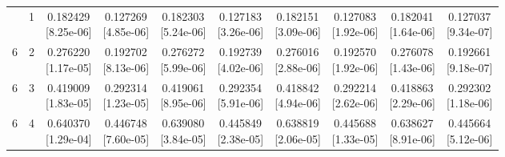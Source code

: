 \documentclass[12pt,letterpaper]{article}
\theoremstyle{plain}
\theoremstyle{definition}
\begin{document}
\begin{table}[p]
\begin{adjustbox}{max width=\linewidth}
\begin{tabular}{@{}rr*{8}{c}@{}}
\addlinespace[2pt]
6 & 1 & \shortstack{0.182429\\[-1pt]{\scriptsize[8.25e-06]}} & \shortstack{0.127269\\[-1pt]{\scriptsize[4.85e-06]}} & \shortstack{0.182303\\[-1pt]{\scriptsize[5.24e-06]}} & \shortstack{0.127183\\[-1pt]{\scriptsize[3.26e-06]}} & \shortstack{0.182151\\[-1pt]{\scriptsize[3.09e-06]}} & \shortstack{0.127083\\[-1pt]{\scriptsize[1.92e-06]}} & \shortstack{0.182041\\[-1pt]{\scriptsize[1.64e-06]}} & \shortstack{0.127037\\[-1pt]{\scriptsize[9.34e-07]}}\\
6 & 2 & \shortstack{0.276220\\[-1pt]{\scriptsize[1.17e-05]}} & \shortstack{0.192702\\[-1pt]{\scriptsize[8.13e-06]}} & \shortstack{0.276272\\[-1pt]{\scriptsize[5.99e-06]}} & \shortstack{0.192739\\[-1pt]{\scriptsize[4.02e-06]}} & \shortstack{0.276016\\[-1pt]{\scriptsize[2.88e-06]}} & \shortstack{0.192570\\[-1pt]{\scriptsize[1.92e-06]}} & \shortstack{0.276078\\[-1pt]{\scriptsize[1.43e-06]}} & \shortstack{0.192661\\[-1pt]{\scriptsize[9.18e-07]}}\\
6 & 3 & \shortstack{0.419009\\[-1pt]{\scriptsize[1.83e-05]}} & \shortstack{0.292314\\[-1pt]{\scriptsize[1.23e-05]}} & \shortstack{0.419061\\[-1pt]{\scriptsize[8.95e-06]}} & \shortstack{0.292354\\[-1pt]{\scriptsize[5.91e-06]}} & \shortstack{0.418842\\[-1pt]{\scriptsize[4.94e-06]}} & \shortstack{0.292214\\[-1pt]{\scriptsize[2.62e-06]}} & \shortstack{0.418863\\[-1pt]{\scriptsize[2.29e-06]}} & \shortstack{0.292302\\[-1pt]{\scriptsize[1.18e-06]}}\\
6 & 4 & \shortstack{0.640370\\[-1pt]{\scriptsize[1.29e-04]}} & \shortstack{0.446748\\[-1pt]{\scriptsize[7.60e-05]}} & \shortstack{0.639080\\[-1pt]{\scriptsize[3.84e-05]}} & \shortstack{0.445849\\[-1pt]{\scriptsize[2.38e-05]}} & \shortstack{0.638819\\[-1pt]{\scriptsize[2.06e-05]}} & \shortstack{0.445688\\[-1pt]{\scriptsize[1.33e-05]}} & \shortstack{0.638627\\[-1pt]{\scriptsize[8.91e-06]}} & \shortstack{0.445664\\[-1pt]{\scriptsize[5.12e-06]}}\\

\end{tabular}
\end{adjustbox}
\end{table}
\end{document}
